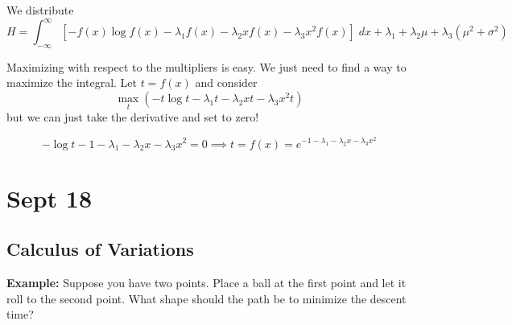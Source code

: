 \documentclass[12pt]{article}
\begin{document}
        We distribute 
        \[H = \int_{-\infty}^{\infty} \left[-f(x)\log f(x) - \lambda_1 f(x) - \lambda_2 xf(x) - \lambda_3 x^2 f(x)\right]\; dx + \lambda_1 + \lambda_2 \mu + \lambda_3(\mu^2 + \sigma^2)\]

        Maximizing with respect to the multipliers is easy. We just need to find a way to maximize the integral. Let $t = f(x)$ and consider 
        \[\max_t \left(-t \log t - \lambda_1 t - \lambda_2xt - \lambda_3 x^2 t\right)\]
        but we can just take the derivative and set to zero! 

        \[-\log t - 1 - \lambda_1 - \lambda_2 x - \lambda_3 x^2 = 0 \implies t = f(x) = e^{-1 - \lambda_1 - \lambda_2 x - \lambda_3 x^2}\]

\section{Sept 18}
\subsection*{Calculus of Variations}
    \textbf{Example:} Suppose you have two points. Place a ball at the first point and let it roll to the second point. What shape should the path be to minimize the descent time? 
\end{document}
